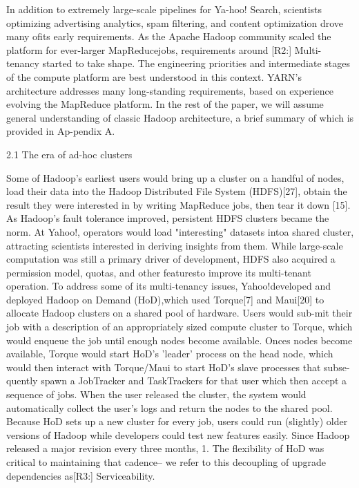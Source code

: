 In addition to extremely large-scale pipelines for Ya-hoo! Search, scientists
optimizing advertising analytics, spam filtering, and content optimization
drove many ofits early requirements.
As the Apache Hadoop community scaled the platform for ever-larger
MapReducejobs, requirements around [R2:] Multi-tenancy started to take shape. 
The engineering priorities and intermediate stages of the compute platform are
best understood in this context. 
YARN's architecture addresses many long-standing requirements, based on
experience evolving the MapReduce platform. 
In the rest of the paper, we will assume general understanding of classic Hadoop
architecture, a brief summary of which is provided in Ap-pendix A.

2.1 The era of ad-hoc clusters

Some of Hadoop's earliest users would bring up a cluster on a handful of
nodes, load their data into the Hadoop Distributed File System (HDFS)[27],
obtain the result they were interested in by writing MapReduce jobs, then tear
it down [15]. 
As Hadoop's fault tolerance improved, persistent HDFS clusters became the
norm.
At Yahoo!, operators would load "interesting" datasets intoa shared
cluster, attracting scientists interested in deriving insights from them.
While large-scale computation was still a primary driver of development, HDFS
also acquired a permission model, quotas, and other featuresto improve its
multi-tenant operation.
To address some of its multi-tenancy issues, Yahoo!developed and deployed
Hadoop on Demand (HoD),which used Torque[7] and Maui[20] to allocate Hadoop
clusters on a shared pool of hardware. 
Users would sub-mit their job with a description of an appropriately sized
compute cluster to Torque, which would enqueue the job until enough nodes become
available. 
Onces nodes become available, Torque would start HoD's 'leader' process on the
head node, which would then interact with Torque/Maui to start HoD's slave
processes that subse-quently spawn a JobTracker and TaskTrackers for that user
which then accept a sequence of jobs.
When the user released the cluster, the system would automatically collect the
user's logs and return the nodes to the shared pool.
Because HoD sets up a new cluster for every job, users could run (slightly)
older versions of Hadoop while developers could test new features easily.
Since Hadoop released a major revision every three months, 1. 
The flexibility of HoD was critical to maintaining that cadence-- we refer to
this decoupling of upgrade dependencies as[R3:] Serviceability.

